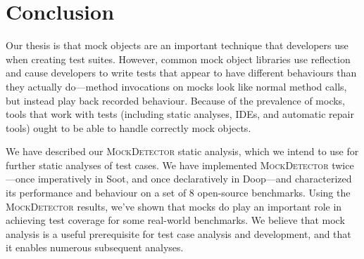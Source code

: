 \section{Conclusion}
\label{sec:conclusion}

Our thesis is that mock objects are an important technique that developers use when creating test suites. However, common mock object libraries use reflection and cause developers to write tests that appear to have different behaviours than they actually do---method invocations on mocks look like normal method calls, but instead play back recorded behaviour. Because of the prevalence of mocks, tools that work with tests (including static analyses, IDEs, and automatic repair tools) ought to be able to handle correctly mock objects. 

We have described our \textsc{MockDetector} static analysis, which we intend to use for further static analyses of test cases. We have implemented \textsc{MockDetector} twice---once imperatively in Soot, and once declaratively in Doop---and characterized its performance and behaviour on a set of 8 open-source benchmarks. Using the \textsc{MockDetector} results, we've shown that mocks do play an important role in achieving test coverage for some real-world benchmarks. We believe that mock analysis is a useful prerequisite for test case analysis and development, and that it enables numerous subsequent analyses.



